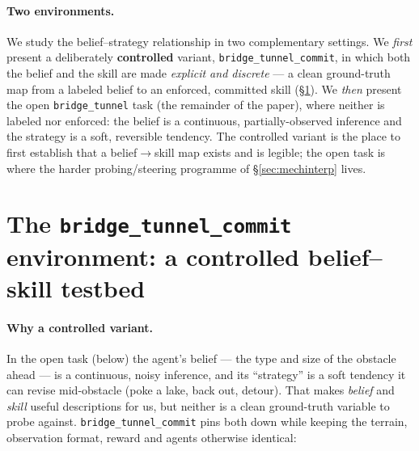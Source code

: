 \documentclass[11pt]{article}
\newcommand{\code}[1]{\texttt{#1}}
\begin{document}
\paragraph{Two environments.} We study the belief--strategy relationship in two
complementary settings. We \emph{first} present a deliberately \textbf{controlled}
variant, \code{bridge\_tunnel\_commit}, in which both the belief and the skill are
made \emph{explicit and discrete} --- a clean ground-truth map from a labeled belief
to an enforced, committed skill (\S\ref{sec:commit}). We \emph{then} present the
open \code{bridge\_tunnel} task (the remainder of the paper), where neither is
labeled nor enforced: the belief is a continuous, partially-observed inference and
the strategy is a soft, reversible tendency. The controlled variant is the place
to first establish that a belief$\to$skill map exists and is legible; the open task
is where the harder probing/steering programme of \S\ref{sec:mechinterp} lives.

\section{The \code{bridge\_tunnel\_commit} environment: a controlled
belief--skill testbed}\label{sec:commit}

\paragraph{Why a controlled variant.} In the open task (below) the agent's belief
--- the type and size of the obstacle ahead --- is a continuous, noisy inference,
and its ``strategy'' is a soft tendency it can revise mid-obstacle (poke a lake,
back out, detour). That makes \emph{belief} and \emph{skill} useful descriptions
for us, but neither is a clean ground-truth variable to probe against.
\code{bridge\_tunnel\_commit} pins both down while keeping the terrain, observation
format, reward and agents otherwise identical:
\end{document}
